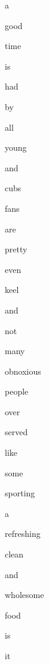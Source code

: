 \documentclass[varwidth]{standalone}
\begin{document}
 \begin{CJK*}{UTF8}{gbsn} 
{\setlength{\fboxsep}{0pt}\colorbox{white!0}{\parbox{0.9\textwidth}{
\colorbox{red!46.13701248168945}{\strut a} 
\colorbox{red!34.19107437133789}{\strut good} 
\colorbox{red!64.25657653808594}{\strut time} 
\colorbox{red!29.597782135009766}{\strut is} 
\colorbox{red!79.26667022705078}{\strut had} 
\colorbox{red!64.09501647949219}{\strut by} 
\colorbox{red!32.86478042602539}{\strut all} 
\colorbox{red!70.43880462646484}{\strut young} 
\colorbox{red!100.0}{\strut and} 
\colorbox{red!26.276897430419922}{\strut cubs} 
\colorbox{red!89.24401092529297}{\strut fans} 
\colorbox{red!49.20012664794922}{\strut are} 
\colorbox{red!77.20030212402344}{\strut pretty} 
\colorbox{red!60.29373550415039}{\strut even} 
\colorbox{red!13.6593656539917}{\strut keel} 
\colorbox{red!9.56915283203125}{\strut and} 
\colorbox{red!69.65663146972656}{\strut not} 
\colorbox{red!37.35983657836914}{\strut many} 
\colorbox{red!0.0}{\strut obnoxious} 
\colorbox{red!13.010663986206055}{\strut people} 
\colorbox{red!14.437031745910645}{\strut over} 
\colorbox{red!11.004676818847656}{\strut served} 
\colorbox{red!45.384971618652344}{\strut like} 
\colorbox{red!4.422176361083984}{\strut some} 
\colorbox{red!6.851515769958496}{\strut sporting} 
\colorbox{red!22.9182186126709}{\strut a} 
\colorbox{red!53.13114929199219}{\strut refreshing} 
\colorbox{red!87.83870697021484}{\strut clean} 
\colorbox{red!34.885467529296875}{\strut and} 
\colorbox{red!50.38262176513672}{\strut wholesome} 
\colorbox{red!73.87097930908203}{\strut food} 
\colorbox{red!65.83368682861328}{\strut is} 
\colorbox{red!57.3800163269043}{\strut it} 

}}}\end{CJK*}
\end{document}
